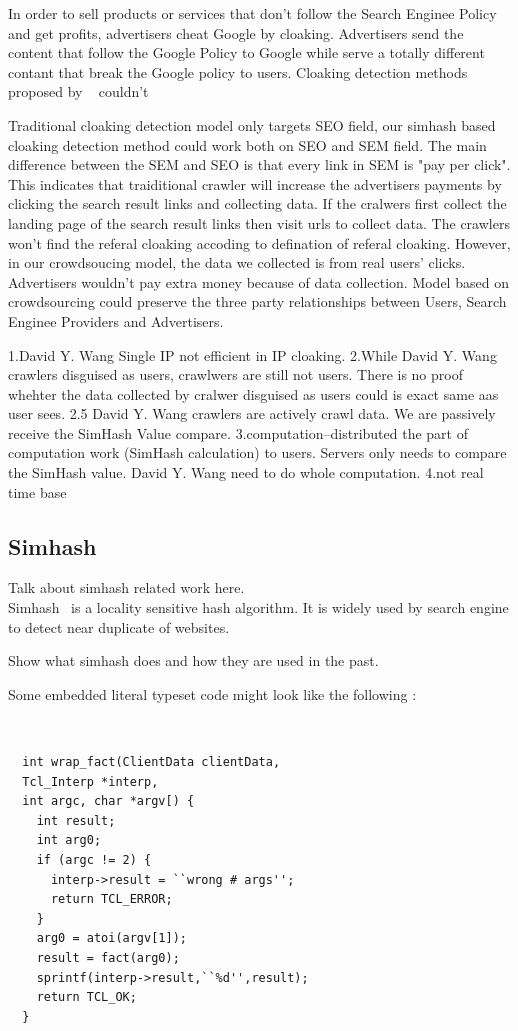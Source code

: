 In order to sell products or services that don't follow the Search Enginee Policy and get profits, advertisers cheat Google by cloaking. Advertisers send the content that follow the Google Policy to Google while serve a totally different contant that break the Google policy to users. Cloaking detection methods proposed by ~\cite{wang2011cloak} couldn't 

Traditional cloaking detection model only targets SEO field, our simhash based cloaking detection method could work both on SEO and SEM field. The main difference between the SEM and SEO is that every link in SEM is "pay per click". This indicates that  traiditional crawler will increase the advertisers payments by clicking the search result links and collecting data. If the cralwers first collect the landing page of the search result links then visit urls to collect data. The crawlers won't find the referal cloaking accoding to defination of referal cloaking. However, in our crowdsoucing model, the data we collected is from real users' clicks. Advertisers wouldn't pay extra money because of data collection. 
Model based on crowdsourcing could preserve the three party relationships between Users, Search Enginee Providers and Advertisers.

1.David Y. Wang Single IP not efficient in  IP cloaking.
2.While David Y. Wang crawlers disguised as users, crawlwers are still not users. There is no proof whehter the data collected by cralwer disguised as users could is exact same aas user sees. 
2.5 David Y. Wang crawlers are actively crawl data. We are passively receive the SimHash Value compare. 
3.computation--distributed the part of computation work (SimHash calculation) to users. Servers only needs to compare the SimHash value. David Y. Wang need to do whole computation. 
4.not real time base

\subsection{Simhash}
Talk about simhash related work here. \\
Simhash~\cite{charikar2002similarity}  is a locality sensitive hash algorithm.
It is widely used by search engine to detect near duplicate of websites.


Show what simhash does and how they are used in the past.

Some embedded literal typeset code might 
look like the following :

{\tt \small
  \begin{verbatim}
  int wrap_fact(ClientData clientData,
  Tcl_Interp *interp,
  int argc, char *argv[) {
    int result;
    int arg0;
    if (argc != 2) {
      interp->result = ``wrong # args'';
      return TCL_ERROR;
    }
    arg0 = atoi(argv[1]);
    result = fact(arg0);
    sprintf(interp->result,``%d'',result);
    return TCL_OK;
  }
  \end{verbatim}
}

